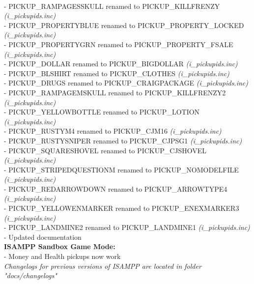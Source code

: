 \documentclass{article}
\begin{document}
\\- PICKUP\_RAMPAGESSKULL renamed to PICKUP\_KILLFRENZY \textit{(i\_pickupids.inc)}
\\- PICKUP\_PROPERTYBLUE renamed to PICKUP\_PROPERTY\_LOCKED \textit{(i\_pickupids.inc)}
\\- PICKUP\_PROPERTYGRN renamed to PICKUP\_PROPERTY\_FSALE \textit{(i\_pickupids.inc)}
\\- PICKUP\_DOLLAR renamed to PICKUP\_BIGDOLLAR \textit{(i\_pickupids.inc)}
\\- PICKUP\_BLSHIRT renamed to PICKUP\_CLOTHES \textit{(i\_pickupids.inc)}
\\- PICKUP\_DRUGS renamed to PICKUP\_CRAIGPACKAGE \textit{(i\_pickupids.inc)}
\\- PICKUP\_RAMPAGEMSKULL renamed to PICKUP\_KILLFRENZY2 \textit{(i\_pickupids.inc)}
\\- PICKUP\_YELLOWBOTTLE renamed to PICKUP\_LOTION \textit{(i\_pickupids.inc)}
\\- PICKUP\_RUSTYM4 renamed to PICKUP\_CJM16 \textit{(i\_pickupids.inc)}
\\- PICKUP\_RUSTYSNIPER renamed to PICKUP\_CJPSG1 \textit{(i\_pickupids.inc)}
\\- PICKUP\_SQUARESHOVEL renamed to PICKUP\_CJSHOVEL \textit{(i\_pickupids.inc)}
\\- PICKUP\_STRIPEDQUESTIONM renamed to PICKUP\_NOMODELFILE \textit{(i\_pickupids.inc)}
\\- PICKUP\_REDARROWDOWN renamed to PICKUP\_ARROWTYPE4 \textit{(i\_pickupids.inc)}
\\- PICKUP\_YELLOWENMARKER renamed to PICKUP\_ENEXMARKER3 \textit{(i\_pickupids.inc)}
\\- PICKUP\_LANDMINE2 renamed to PICKUP\_LANDMINE1 \textit{(i\_pickupids.inc)}
\\- Updated documentation
\bigskip
\\\textbf{ISAMPP Sandbox Game Mode:}
\\- Money and Health pickups now work 
\bigskip
\\\textit{Changelogs for previous versions of ISAMPP are located in folder "docs/changelogs"}

\newpage
\end{document}
